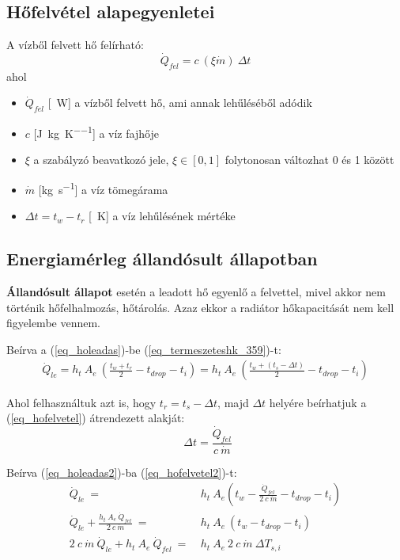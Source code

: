 \subsection{Hőfelvétel alapegyenletei}
A vízből felvett hő felírható:
\begin{equation} \label{eq_hofelvetel}
\dot Q_{fel} = c ~ (\xi\dot{m}) ~ \Delta t
\end{equation}
ahol
\begin{itemize}[itemsep=6pt,topsep=0pt,parsep=0pt,partopsep=0pt]
	\item[] $\dot{Q}_{fel}$ [\SI{}{\watt}] a vízből felvett hő, ami annak lehűléséből adódik
	\item[] $c$ [\si[per-mode = fraction]{\joule\per\kg\per\kelvin}] a víz fajhője
	\item[] $\xi$ a szabályzó beavatkozó jele, $ \xi \in [0,1]$ folytonosan változhat 0 és 1 között
	\item[] $\dot{m}$ [\si[per-mode = fraction]{\kg\per\second}] a víz tömegárama
	\item[] $\Delta t = t_w-t_r$ [\SI{}{\kelvin}] a víz lehűlésének mértéke
\end{itemize}

\subsection{Energiamérleg állandósult állapotban}
\textbf{Állandósult állapot} esetén a leadott hő egyenlő a felvettel, mivel akkor nem történik hőfelhalmozás, hőtárolás.
Azaz ekkor a radiátor hőkapacitását nem kell figyelembe vennem.

Beírva a (\ref{eq_holeadas})-be (\ref{eq_termeszeteshk_359})-t:
\begin{equation} \label{eq_holeadas2}
\begin{aligned}
\dot Q_{le} = h_t ~ A_e ~ \left( \frac{t_w+t_r}{2}-t_{drop} - t_i\right) = h_t ~ A_e ~ \left( \frac{t_w+(t_s-\Delta t)}{2}-t_{drop}-t_i\right)
\end{aligned}
\end{equation}

Ahol felhasználtuk azt is, hogy $t_r = t_s-\Delta t$, majd $\Delta t$ helyére beírhatjuk a (\ref{eq_hofelvetel})  átrendezett alakját:
\begin{equation} \label{eq_hofelvetel2}
~~\Delta t = \frac{\dot Q_{fel}}{c ~ \dot{m}}
\end{equation}

Beírva (\ref{eq_holeadas2})-ba (\ref{eq_hofelvetel2})-t:
\begin{equation} \label{holeadas3}
\begin{aligned}
\dot Q_{le} ~=~ & h_t~ A_e\left( t_w-\frac{\dot Q_{fel}}{2~c ~ \dot{m}}-t_{drop}-t_i\right)  \\[18pt]
\dot Q_{le} + \frac{h_t ~ A_e ~ \dot Q_{fel}}{2 ~ c ~ \dot{m}} ~ = ~ & h_t ~ A_e ~\left( t_w-t_{drop}-t_i\right) \\[24pt]
2 ~ c ~ \dot{m} ~ \dot Q_{le} + h_t ~ A_e ~ \dot Q_{fel} ~ = ~ &  h_t ~ A_e ~ 2~ c~ \dot{m} ~\Delta T_{s,i}
\end{aligned}
\end{equation}


